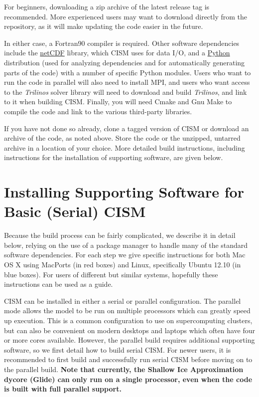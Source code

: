 For beginners, downloading a zip archive of the latest release tag is recommended. 
More experienced users may want to download directly from the repository, 
as it will make updating the code easier in the future.

In either case, a Fortran90 compiler is required.  
Other software dependencies include the \href{http://www.unidata.ucar.edu/packages/netcdf/index.html}{netCDF} library, 
which CISM uses for data I/O, and a \href{http://www.python.org}{Python} distribution 
(used for analyzing dependencies and for automatically generating parts of the code) 
with a number of specific Python modules. Users who want to run the code in parallel will also need to install MPI, 
and users who want access to the \textit{Trilinos} solver library will need to 
download and build \textit{Trilinos}, and link to it when building CISM. 
Finally, you will need Cmake and Gnu Make to compile the code and link to the various third-party libraries. 

If you have not done so already, clone a tagged version of CISM or download an archive of the code, as noted above. Store the code or the unzipped, untarred archive in a location of your choice. More detailed build instructions, including instructions for the installation of supporting software, are given below.

\section{Installing Supporting Software for Basic (Serial) CISM}

Because the build process can be fairly complicated, we describe it in detail below, 
relying on the use of a package manager to handle many of the standard software dependencies. 
For each step we give specific instructions for both Mac OS X using MacPorts (in red boxes) and
Linux, specifically Ubuntu 12.10 (in blue boxes).  For users of different but similar systems,
hopefully these instructions can be used as a guide.

CISM can be installed in either a serial or parallel configuration. The parallel mode
allows the model to be run on multiple processors which can greatly speed up execution.
This is a common configuration to use on supercomputing clusters, but can also be 
convenient on modern desktops and laptops which often have four or more cores available.
However, the parallel build requires additional supporting software, so we first 
detail how to build serial CISM.  For newer users, it is recommended to first build
and successfully run serial CISM before moving on to the parallel build.  \textbf{Note
that currently, the Shallow Ice Approximation dycore (Glide) can only run on a single processor, 
even when the code is built with full parallel support.}

